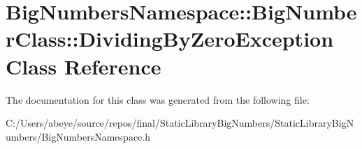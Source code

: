 \hypertarget{class_big_numbers_namespace_1_1_big_number_class_1_1_dividing_by_zero_exception}{}\section{Big\+Numbers\+Namespace\+:\+:Big\+Number\+Class\+:\+:Dividing\+By\+Zero\+Exception Class Reference}
\label{class_big_numbers_namespace_1_1_big_number_class_1_1_dividing_by_zero_exception}


The documentation for this class was generated from the following file\+:\begin{DoxyCompactItemize}
\item 
C\+:/\+Users/abeye/source/repos/final/\+Static\+Library\+Big\+Numbers/\+Static\+Library\+Big\+Numbers/Big\+Numbers\+Namespace.\+h\end{DoxyCompactItemize}
